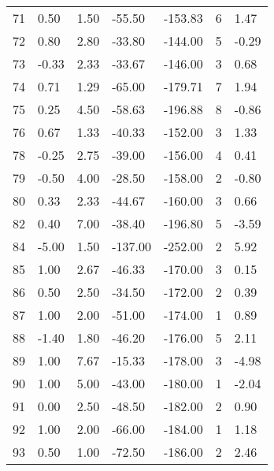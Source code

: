 \begin{appendices}
\begin{longtable}[c]{@{}lllllll@{}}
71 & 0.50 & 1.50 & -55.50 & -153.83 & 6 & 1.47 \\

72 & 0.80 & 2.80 & -33.80 & -144.00 & 5 & -0.29 \\

73 & -0.33 & 2.33 & -33.67 & -146.00 & 3 & 0.68 \\

74 & 0.71 & 1.29 & -65.00 & -179.71 & 7 & 1.94 \\

75 & 0.25 & 4.50 & -58.63 & -196.88 & 8 & -0.86 \\

76 & 0.67 & 1.33 & -40.33 & -152.00 & 3 & 1.33 \\

78 & -0.25 & 2.75 & -39.00 & -156.00 & 4 & 0.41 \\

79 & -0.50 & 4.00 & -28.50 & -158.00 & 2 & -0.80 \\

80 & 0.33 & 2.33 & -44.67 & -160.00 & 3 & 0.66 \\

82 & 0.40 & 7.00 & -38.40 & -196.80 & 5 & -3.59 \\

84 & -5.00 & 1.50 & -137.00 & -252.00 & 2 & 5.92 \\

85 & 1.00 & 2.67 & -46.33 & -170.00 & 3 & 0.15 \\

86 & 0.50 & 2.50 & -34.50 & -172.00 & 2 & 0.39 \\

87 & 1.00 & 2.00 & -51.00 & -174.00 & 1 & 0.89 \\

88 & -1.40 & 1.80 & -46.20 & -176.00 & 5 & 2.11 \\

89 & 1.00 & 7.67 & -15.33 & -178.00 & 3 & -4.98 \\

90 & 1.00 & 5.00 & -43.00 & -180.00 & 1 & -2.04 \\

91 & 0.00 & 2.50 & -48.50 & -182.00 & 2 & 0.90 \\

92 & 1.00 & 2.00 & -66.00 & -184.00 & 1 & 1.18 \\

93 & 0.50 & 1.00 & -72.50 & -186.00 & 2 & 2.46 \\


\end{longtable}
\end{appendices}
